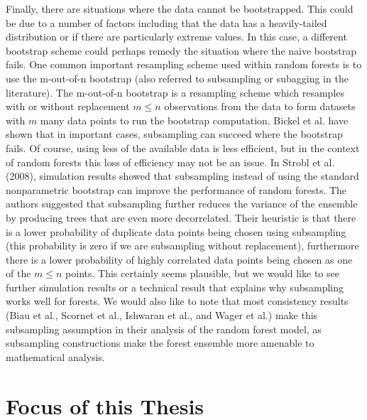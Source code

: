 \documentclass[12pt,twoside]{reedthesis}
\theoremstyle{definition}
\theoremstyle{definition}
\theoremstyle{definition}
\theoremstyle{remark}
\begin{document}
Finally, there are situations where the data cannot be bootstrapped.
This could be due to a number of factors including that the data has a
heavily-tailed distribution or if there are particularly extreme values.
In this case, a different bootstrap scheme could perhaps remedy the
situation where the naive bootstrap fails. One common important
resampling scheme used within random forests is to use the m-out-of-n
bootstrap (also referred to subsampling or subagging in the literature).
The m-out-of-n bootstrap is a resampling scheme which resamples with or
without replacement \(m\leq n\) observations from the data to form
datasets with \(m\) many data points to run the bootstrap computation.
Bickel et al. have shown that in important cases, subsampling can
succeed where the bootstrap fails. Of course, using less of the
available data is less efficient, but in the context of random forests
this loss of efficiency may not be an issue. In Strobl et al. (2008),
simulation results showed that subsampling instead of using the standard
nonparametric bootstrap can improve the performance of random forests.
The authors suggested that subsampling further reduces the variance of
the ensemble by producing trees that are even more decorrelated. Their
heuristic is that there is a lower probability of duplicate data points
being chosen using subsampling (this probability is zero if we are
subsampling without replacement), furthermore there is a lower
probability of highly correlated data points being chosen as one of the
\(m\leq n\) points. This certainly seems plausible, but we would like to
see further simulation results or a technical result that explains why
subsampling works well for forests. We would also like to note that most
consistency results (Biau et al., Scornet et al., Ishwaran et al., and
Wager et al.) make this subsampling assumption in their analysis of the
random forest model, as subsampling constructions make the forest
ensemble more amenable to mathematical analysis. \par

\section{Focus of this Thesis}\label{focus-of-this-thesis}
\end{document}
